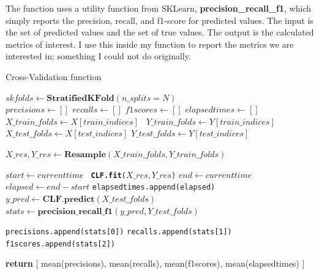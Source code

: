 \documentclass[12pt,a4paper,twoside]{report}
\begin{document}
The function uses a utility function from SKLearn, \textbf{precision\_recall\_f1}, which simply reports the precision, recall, and f1-score for predicted values. The input is the set of predicted values and the set of true values. The output is the calculated metrics of interest. I use this inside my function to report the metrics we are interested in; something I could not do originally. 

\begin{algorithm}[!htbp]
\caption{Cross-Validation function }\label{alg:cross-val}
\begin{algorithmic}[1]

   \State $skfolds\gets \textbf{StratifiedKFold}(n\_splits = N)$\\
   
   \State $precisions\gets []$
   \State $recalls\gets []$
   \State $f1scores\gets []$
   \State $elapsedtimes\gets []$\\
   
        \State
         \texttt{\State $X\_train\_folds\gets X[train\_indices]$}
        \texttt{ \State $Y\_train\_folds\gets Y[train\_indices]$}
        \texttt{ \State $X\_test\_folds\gets X[test\_indices]$}
         \texttt{\State $Y\_test\_folds\gets Y[test\_indices]$}
         
         \texttt{\State $X\_res, Y\_res \gets \textbf{Resample}(X\_train\_folds,Y\_train\_folds)$}
         
          \texttt{\State $ start \gets current time$} 
          \texttt{ \State \textbf{CLF.fit}($X\_res, Y\_res$)} 
          \texttt{\State $ end \gets current time$} 
          \texttt{\State $ elapsed \gets end - start$} 
          \texttt{\State elapsedtimes.append(elapsed)} 
           \texttt{\State $y\_pred \gets \textbf{CLF.predict}(X\_test\_folds)$} 
          \texttt{\State $stats \gets \textbf{precision\_recall\_f1}(y\_pred, Y\_test\_folds )$} 
          
          \texttt{\State precisions.append(stats[0])}
          \texttt{\State recalls.append(stats[1])}  
          \texttt{\State f1scores.append(stats[2])} 
   \EndFor
   
   \State \textbf{return} [ mean(precisions), mean(recalls), mean(f1scores), mean(elapsedtimes) ]
   
\EndProcedure
\end{algorithmic}
\end{algorithm}
\end{document}
